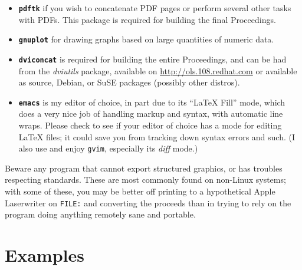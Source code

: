 \documentclass[final]{ols}
\begin{document}
\begin{itemize}
\item \textbf{\texttt{pdftk}} if you wish to concatenate PDF pages or
  perform several other tasks with PDFs.  This package is required for
  building the final Proceedings.

\item \textbf{\texttt{gnuplot}} for drawing graphs based on large
  quantities of numeric data.

\item \textbf{\texttt{dviconcat}} is required for building the entire
  Proceedings, and can be had from the \textit{dviutils} package,
  available on \url{http://ols.108.redhat.com} or available as source,
  Debian, or SuSE packages (possibly other distros).

\item \textbf{\texttt{emacs}} is my editor of choice, in part due to its
``LaTeX Fill'' mode, which does a very nice job of handling markup and
syntax, with automatic line wraps.  Please check to see if your editor of
choice has a mode for editing {\LaTeX} files; it could save you from
tracking down syntax errors and such.  (I also use and enjoy
\texttt{gvim}, especially its \textit{diff} mode.)

\end{itemize}

Beware any program that cannot export structured graphics, or has
troubles respecting standards.  These are most commonly found on
non-Linux systems; with some of these, you may be better off
printing to a hypothetical Apple Laserwriter on \texttt{FILE:} and
converting the proceeds than in trying to rely on the program doing
anything remotely sane and portable.

\section{Examples}
\end{document}
